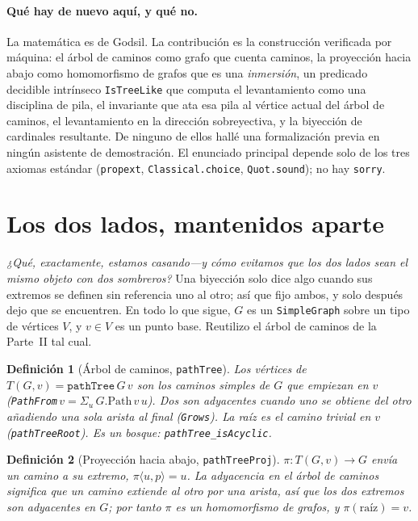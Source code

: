\documentclass[11pt]{article}
\newtheorem{definition}{Definici\'on}
\newcommand{\lean}[1]{\texttt{#1}}
\begin{document}
\paragraph{Qu\'e hay de nuevo aqu\'i, y qu\'e no.} La matem\'atica es de Godsil. La contribuci\'on es la
construcci\'on verificada por m\'aquina: el \'arbol de caminos como grafo que cuenta caminos, la
proyecci\'on hacia abajo como homomorfismo de grafos que es una \emph{inmersi\'on}, un predicado
decidible intr\'inseco \lean{IsTreeLike} que computa el levantamiento como una disciplina de pila, el
invariante que ata esa pila al v\'ertice actual del \'arbol de caminos, el levantamiento en la
direcci\'on sobreyectiva, y la biyecci\'on de cardinales resultante. De ninguno de ellos hall\'e una
formalizaci\'on previa en ning\'un asistente de demostraci\'on. El enunciado principal depende solo de
los tres axiomas est\'andar (\lean{propext}, \lean{Classical.choice}, \lean{Quot.sound}); no hay
\lean{sorry}.

\section{Los dos lados, mantenidos aparte}
\label{sec:objects}

\emph{¿Qu\'e, exactamente, estamos casando---y c\'omo evitamos que los dos lados sean el mismo objeto
con dos sombreros?} Una biyecci\'on solo dice algo cuando sus extremos se definen sin referencia uno al
otro; as\'i que fijo ambos, y solo despu\'es dejo que se encuentren. En todo lo que sigue, $G$ es un
\lean{SimpleGraph} sobre un tipo de v\'ertices $V$, y $v\in V$ es un punto base. Reutilizo el \'arbol de
caminos de la Parte~II tal cual.

\begin{definition}[\'Arbol de caminos, \lean{pathTree}]
Los v\'ertices de $T(G,v)=\lean{pathTree}\,G\,v$ son los caminos simples de $G$ que empiezan en $v$
(\lean{PathFrom}\,$v=\Sigma_{u}\,G.\mathrm{Path}\,v\,u$). Dos son adyacentes cuando uno se obtiene del
otro a\~nadiendo una sola arista al final (\lean{Grows}). La ra\'iz es el camino trivial en $v$
(\lean{pathTreeRoot}). Es un bosque: \lean{pathTree\_isAcyclic}.
\end{definition}

\begin{definition}[Proyecci\'on hacia abajo, \lean{pathTreeProj}]
$\pi\colon T(G,v)\to G$ env\'ia un camino a su extremo, $\pi\langle u,p\rangle=u$. La adyacencia en el
\'arbol de caminos significa que un camino extiende al otro por una arista, as\'i que los dos extremos
son adyacentes en $G$; por tanto $\pi$ es un homomorfismo de grafos, y $\pi(\text{ra\'iz})=v$.
\end{definition}
\end{document}
